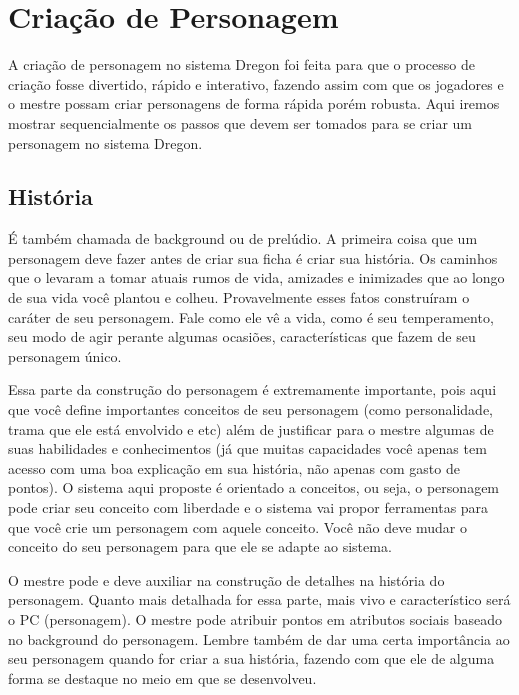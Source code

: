 

\chapter{Criação de Personagem}
\label{Cap:cdp}


A criação de personagem no sistema Dregon foi feita para que o processo de criação fosse divertido, rápido e interativo, fazendo assim com que os jogadores e o mestre possam criar personagens de forma rápida porém robusta. Aqui iremos mostrar sequencialmente os passos que devem ser tomados para se criar um personagem no sistema Dregon.


\section{História}
É também chamada de background ou de prelúdio. A primeira coisa que um personagem deve fazer antes de criar sua ficha é criar sua história. Os caminhos que o levaram a tomar atuais rumos de vida, amizades e inimizades que ao longo de sua vida você plantou e colheu. Provavelmente esses fatos construíram o caráter de seu personagem. Fale como ele vê a vida, como é seu temperamento, seu modo de agir perante algumas ocasiões, características que fazem de seu personagem único.

Essa parte da construção do personagem é extremamente importante, pois aqui que você define importantes conceitos de seu personagem (como personalidade, trama que ele está envolvido e etc) além de justificar para o mestre algumas de suas habilidades e conhecimentos (já que muitas capacidades você apenas tem acesso com uma boa explicação em sua história, não apenas com gasto de pontos). O sistema aqui proposte é orientado a conceitos, ou seja, o personagem pode criar seu conceito com liberdade e o sistema vai propor ferramentas para que você crie um personagem com aquele conceito. Você não deve mudar o conceito do seu personagem para que ele se adapte ao sistema.

O mestre pode e deve auxiliar na construção de detalhes na história do personagem. Quanto mais detalhada for essa parte, mais vivo e característico será o PC (personagem). O mestre pode atribuir pontos em atributos sociais baseado no background do personagem. Lembre também de dar uma certa importância ao seu personagem quando for criar a sua história, fazendo com que ele de alguma forma se destaque no meio em que se desenvolveu. 


